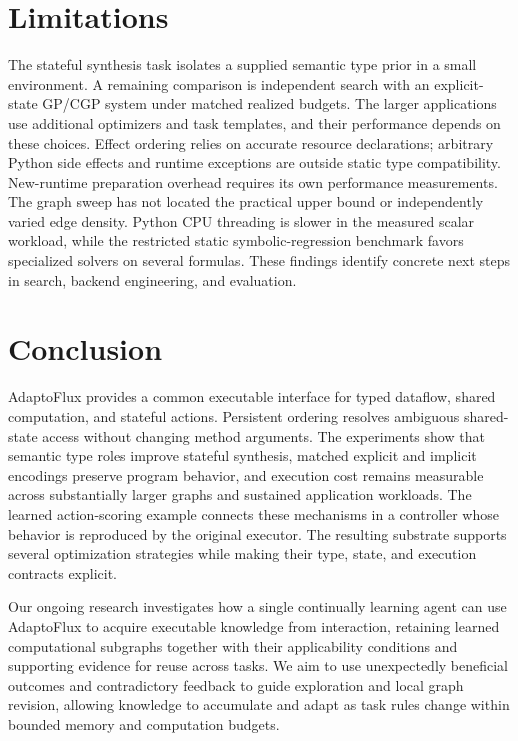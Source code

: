 \section*{Limitations}
\label{sec:limitations}
The stateful synthesis task isolates a supplied semantic type prior in a small environment. A remaining comparison is independent search with an explicit-state GP/CGP system under matched realized budgets. The larger applications use additional optimizers and task templates, and their performance depends on these choices. Effect ordering relies on accurate resource declarations; arbitrary Python side effects and runtime exceptions are outside static type compatibility. New-runtime preparation overhead requires its own performance measurements. The graph sweep has not located the practical upper bound or independently varied edge density. Python CPU threading is slower in the measured scalar workload, while the restricted static symbolic-regression benchmark favors specialized solvers on several formulas. These findings identify concrete next steps in search, backend engineering, and evaluation.

\section{Conclusion}
\label{sec:conclusion}
AdaptoFlux provides a common executable interface for typed dataflow, shared computation, and stateful actions. Persistent ordering resolves ambiguous shared-state access without changing method arguments. The experiments show that semantic type roles improve stateful synthesis, matched explicit and implicit encodings preserve program behavior, and execution cost remains measurable across substantially larger graphs and sustained application workloads. The learned action-scoring example connects these mechanisms in a controller whose behavior is reproduced by the original executor. The resulting substrate supports several optimization strategies while making their type, state, and execution contracts explicit.

Our ongoing research investigates how a single continually learning agent can use AdaptoFlux to acquire executable knowledge from interaction, retaining learned computational subgraphs together with their applicability conditions and supporting evidence for reuse across tasks. We aim to use unexpectedly beneficial outcomes and contradictory feedback to guide exploration and local graph revision, allowing knowledge to accumulate and adapt as task rules change within bounded memory and computation budgets.
\label{maintext:end}
\clearpage

